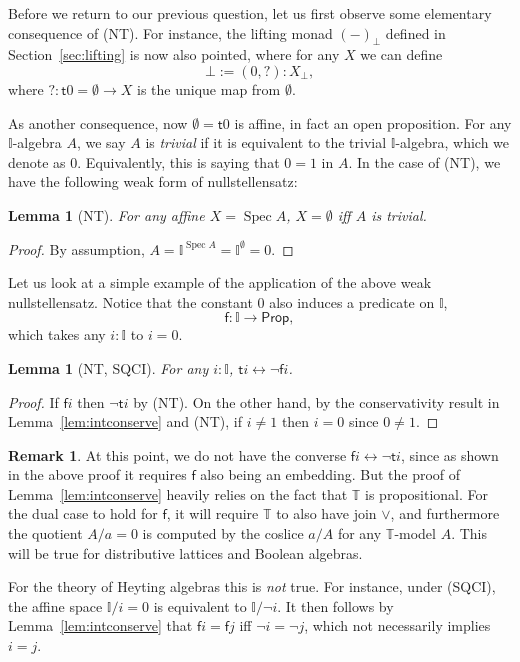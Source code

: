 \documentclass[12pt]{amsart}
\newtheorem{lemma}[theorem]{Lemma}
\theoremstyle{definition}
\newtheorem{remark}[theorem]{Remark}
\newcommand{\mbb}[1]{\mathbb{#1}}
\newcommand{\T}{\mbb T}
\newcommand{\I}{\mbb I}
\newcommand{\ms}[1]{\mathsf{#1}}
\newcommand{\prt}{_{\bot}}
\newcommand{\emp}{\emptyset}
\newcommand{\eq}{\leftrightarrow}
\newcommand{\pp}{\ms{Prop}}
\newcommand{\spec}{\operatorname{Spec}}
\begin{document}
Before we return to our previous question, let us first observe some elementary consequence of (NT). For instance, the lifting monad $(-)\prt$ defined in Section~\ref{sec:lifting} is now also pointed, where for any $X$ we can define
\[ \bot := (0,?) : X\prt, \]
where $? : \ms t0 = \emp \to X$ is the unique map from $\emp$.

As another consequence, now $\emp = \ms t0$ is affine, in fact an open proposition. For any $\I$-algebra $A$, we say $A$ is \emph{trivial} if it is equivalent to the trivial $\I$-algebra, which we denote as $0$. Equivalently, this is saying that $0 = 1$ in $A$. In the case of (NT), we have the following weak form of nullstellensatz:

\begin{lemma}[NT]\label{lem:nulls}
  For any affine $X = \spec A$, $X = \emp$ iff $A$ is trivial.
\end{lemma}
\begin{proof}
  By assumption, $A = \I^{\spec A} = \I^\emp = 0$. 
\end{proof}

Let us look at a simple example of the application of the above weak nullstellensatz. Notice that the constant $0$ also induces a predicate on $\I$,
\[ \ms f : \I \to \pp, \]
which takes any $i : \I$ to $i = 0$. 

\begin{lemma}[NT, SQCI]\label{lem:prefield}
  For any $i : \I$, $\ms ti \eq \neg \ms fi$.
\end{lemma}
\begin{proof}
  If $\ms fi$ then $\neg\ms ti$ by (NT). On the other hand, by the conservativity result in Lemma~\ref{lem:intconserve} and (NT), if $i \neq 1$ then $i = 0$ since $0 \neq 1$.
\end{proof}

\begin{remark}\label{rem:prefield}
  At this point, we do not have the converse $\ms fi \eq \neg \ms ti$, since as shown in the above proof it requires $\ms f$ also being an embedding. But the proof of Lemma~\ref{lem:intconserve} heavily relies on the fact that $\T$ is propositional. For the dual case to hold for $\ms f$, it will require $\T$ to also have join $\vee$, and furthermore the quotient $A/a = 0$ is computed by the coslice $a/A$ for any $\T$-model $A$. This will be true for distributive lattices and Boolean algebras.

  For the theory of Heyting algebras this is \emph{not} true. For instance, under (SQCI), the affine space $\I/i=0$ is equivalent to $\I/\neg i$. It then follows by Lemma~\ref{lem:intconserve} that $\ms fi = \ms fj$ iff $\neg i = \neg j$, which not necessarily implies $i = j$.
\end{remark}
\end{document}
